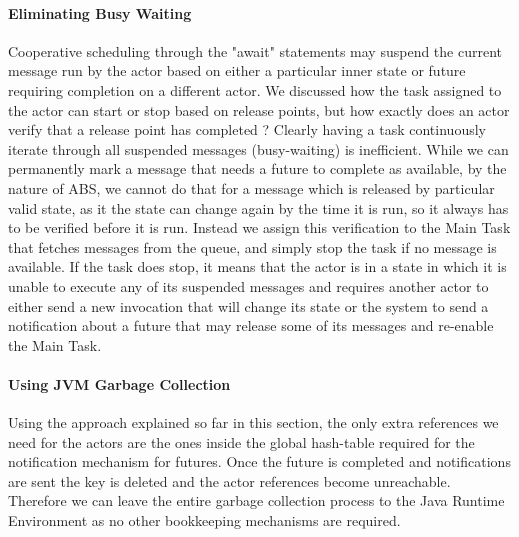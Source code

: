 \paragraph{Eliminating Busy Waiting}
Cooperative scheduling through the "await" statements may suspend the current message run by the actor based on either a particular inner state or future requiring completion on a different actor. We discussed how the task assigned to the actor can start or stop based on release points, but how exactly does an actor verify that a release point has completed ? Clearly having a task continuously iterate through all suspended messages (busy-waiting) is inefficient. While we can permanently mark a message that needs a future to complete as available, by the nature of ABS, we cannot do that for a message which is released by particular valid state, as it the state can change again by the time it is run, so it always has to be verified before it is run. Instead we assign this verification to the Main Task that fetches messages from the queue, and simply stop the task if no message is available. If the task does stop, it means that the actor is in a state in which it is unable to execute any of its suspended messages and requires another actor to either send a new invocation that will change its state or the system to send a notification about a future that may release some of its messages and re-enable the Main Task.  


\paragraph{Using JVM Garbage Collection}
Using the approach explained so far in this section, the only extra references we need for the actors are the ones inside the global hash-table required for the notification mechanism for futures. Once the future is completed and notifications are sent the key is deleted and the actor references become unreachable. Therefore we can leave the entire garbage collection process to the Java Runtime Environment as no other bookkeeping mechanisms are required.

